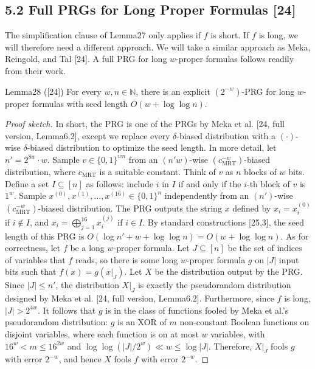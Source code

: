 \subsection*{5.2 Full PRGs for Long Proper Formulas [24]}
The simplification clause of Lemma27 only applies if $f$ is short. If $f$ is long, we will therefore need a different approach. We will take a similar approach as Meka, Reingold, and Tal [24]. A full PRG for long $w$-proper formulas follows readily from their work.
\begin{authorclaim}{Lemma28 ([24])}
For every $w,n\in\mathbb N$, there is an explicit $(2^{-w})$-PRG for long $w$-proper formulas with seed length $O(w+\log\log n)$.
\end{authorclaim}
\begin{proof}[Proof sketch]
In short, the PRG is one of the PRGs by Meka et al. [24, full version, Lemma6.2], except we replace every $\delta$-biased distribution with a $(\cdot)$-wise $\delta$-biased distribution to optimize the seed length.
In more detail, let $n'=2^{8w}\cdot w$. Sample $v\in\{0,1\}^{wn}$ from an $(n'w)$-wise $(c_{\mathrm{MRT}}^{-w})$-biased distribution, where $c_{\mathrm{MRT}}$ is a suitable constant. Think of $v$ as $n$ blocks of $w$ bits. Define a set $I\subseteq[n]$ as follows: include $i$ in $I$ if and only if the $i$-th block of $v$ is $1^w$.
Sample $x^{(0)},x^{(1)},\ldots,x^{(16)}\in\{0,1\}^n$ independently from an $(n')$-wise $(c_{\mathrm{MRT}}^{-w})$-biased distribution. The PRG outputs the string $x$ defined by $x_i=x_i^{(0)}$ if $i\notin I$, and $x_i=\bigoplus_{j=1}^{16}x_i^{(j)}$ if $i\in I$.
By standard constructions [25,3], the seed length of this PRG is $O(\log n'+w+\log\log n)=O(w+\log\log n)$.
As for correctness, let $f$ be a long $w$-proper formula. Let $J\subseteq[n]$ be the set of indices of variables that $f$ reads, so there is some long $w$-proper formula $g$ on $|J|$ input bits such that $f(x)=g(x|_J)$. Let $X$ be the distribution output by the PRG. Since $|J|\le n'$, the distribution $X|_J$ is exactly the pseudorandom distribution designed by Meka et al. [24, full version, Lemma6.2]. Furthermore, since $f$ is long, $|J|>2^{4w}$. It follows that $g$ is in the class of functions fooled by Meka et al.'s pseudorandom distribution: $g$ is an XOR of $m$ non-constant Boolean functions on disjoint variables, where each function is on at most $w$ variables, with $16^w<m\le16^{2w}$ and $\log\log(|J|/2^w)\ll w\le\log|J|$. Therefore, $X|_J$ fools $g$ with error $2^{-w}$, and hence $X$ fools $f$ with error $2^{-w}$.
\end{proof}
